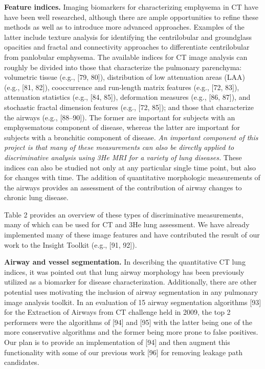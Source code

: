 \documentclass[11pt,]{article}
\begin{document}
\textbf{Feature indices.} Imaging biomarkers for characterizing
emphysema in CT have have been well researched, although there are ample
opportunities to refine these methods as well as to introduce more
advanced approaches. Examples of the latter include texture analysis for
identifying the centrilobular and groundglass opacities and fractal and
connectivity approaches to differentiate centrilobular from panlobular
emphysema. The available indices for CT image analysis can roughly be
divided into those that characterize the pulmonary parenchyma:
volumetric tissue (e.g., {[}79, 80{]}), distribution of low attenuation
areas (LAA) (e.g., {[}81, 82{]}), cooccurrence and run-length matrix
features (e.g., {[}72, 83{]}), attenuation statistics (e.g., {[}84,
85{]}), deformation measures (e.g., {[}86, 87{]}), and stochastic
fractal dimension features (e.g., {[}72, 85{]}); and those that
characterize the airways (e.g., {[}88--90{]}). The former are important
for subjects with an emphysematous component of disease, whereas the
latter are important for subjects with a bronchitic component of
disease. \emph{An important component of this project is that many of
these measurements can also be directly applied to discriminative
analysis using 3He MRI for a variety of lung diseases.} These indices
can also be studied not only at any particular single time point, but
also for changes with time. The addition of quantitative morphologic
measurements of the airways provides an assessment of the contribution
of airway changes to chronic lung disease.



Table 2 provides an overview of these types of discriminative
measurements, many of which can be used for CT and 3He lung assessment.
We have already implemented many of these image features and have
contributed the result of our work to the Insight Toolkit (e.g., {[}91,
92{]}).

\textbf{Airway and vessel segmentation.} In describing the quantitative
CT lung indices, it was pointed out that lung airway morphology has been
previously utilized as a biomarker for disease characterization.
Additionally, there are other potential uses motivating the inclusion of
airway segmentation in any pulmonary image analysis toolkit. In an
evaluation of 15 airway segmentation algorithms {[}93{]} for the
Extraction of Airways from CT challenge held in 2009, the top 2
performers were the algorithms of {[}94{]} and {[}95{]} with the latter
being one of the more conservative algorithms and the former being more
prone to false positives. Our plan is to provide an implementation of
{[}94{]} and then augment this functionality with some of our previous
work {[}96{]} for removing leakage path candidates.
\end{document}
